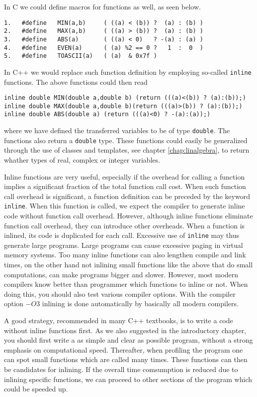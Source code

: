 In C we could define macros for functions as well, as seen below.
\begin{lstlisting}
1.   #define   MIN(a,b)     ( ((a) < (b)) ?  (a) : (b) )
2.   #define   MAX(a,b)     ( ((a) > (b)) ?  (a) : (b) )
3.   #define   ABS(a)       ( ((a) < 0)   ? -(a) : (a) )
4.   #define   EVEN(a)      ( (a) %2 == 0 ?   1  :  0  )
5.   #define   TOASCII(a)   ( (a)  & 0x7f )
\end{lstlisting}
In C++ we would replace such function definition by employing so-called \verb?inline?
functions. The above functions could then read
\begin{lstlisting}
inline double MIN(double a,double b) (return (((a)<(b)) ? (a):(b));)
inline double MAX(double a,double b)(return (((a)>(b)) ? (a):(b));)
inline double ABS(double a) (return (((a)<0) ? -(a):(a));)
\end{lstlisting}
where we have defined the transferred variables to be of type \verb?double?. The functions
also return a \verb?double? type. These functions could easily be generalized through the use
of classes and templates, see chapter \ref{chap:linalgebra}, to return whather types of 
real, complex or integer variables.

Inline functions are very useful, especially if the overhead for calling a function  
implies a significant fraction of the total function call cost. When such function call overhead
is significant, a function definition can be preceded by the keyword \verb?inline?.
When this function is called, we expect the compiler to generate inline code without function
call overhead. However, although inline functions eliminate function call overhead, they can
introduce other overheads. When a function is inlined, its code is duplicated for each call.
Excessive use of \verb?inline? may thus generate large programs. Large programs can cause
excessive paging in virtual memory systems.
Too many inline functions can also lengthen compile and link times, on the other hand not inlining 
small functions like the above that do small computations, can make programs bigger and slower.
However, most modern compilers know better than programmer which functions to inline or not.
When doing this, you should also test various compiler options. With the compiler option
$-O3$ inlining is done automatically by basically all modern compilers. 

A good strategy, recommended in many C++ textbooks, is to write a code without inline functions first.
As we also suggested in the introductory chapter, 
you should first write a as simple and clear 
as possible program, without
a strong emphasis on computational speed. 
Thereafter, when profiling the program one can spot small functions which are called many times.
These functions can then be candidates for inlining. 
If the overall time comsumption is reduced due to inlining
specific functions, we can proceed to other sections of the program which could be speeded up.

